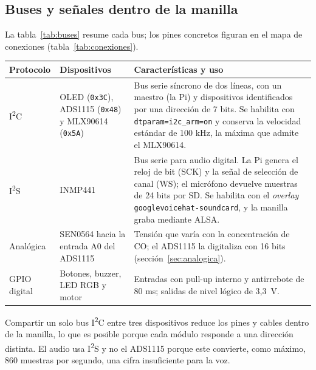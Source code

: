 \documentclass[10pt,a4paper]{article}
\newcommand{\code}[1]{{\small\urlstyle{tt}\nolinkurl{#1}}}
\begin{document}
\subsection{Buses y señales dentro de la manilla}
La tabla~\ref{tab:buses} resume cada bus; los pines concretos figuran en el mapa de conexiones (tabla~\ref{tab:conexiones}).

\label{tab:buses}
\begin{tabularx}{\linewidth}{@{}P{22mm}P{38mm}Y@{}}
\toprule\textbf{Protocolo} & \textbf{Dispositivos} & \textbf{Características y uso}\\\midrule
I\textsuperscript{2}C & OLED (\code{0x3C}), ADS1115 (\code{0x48}) y MLX90614 (\code{0x5A}) & Bus serie síncrono de dos líneas, con un maestro (la Pi) y dispositivos identificados por una dirección de 7 bits. Se habilita con \code{dtparam=i2c_arm=on} y conserva la velocidad estándar de 100 kHz, la máxima que admite el MLX90614.\\
I\textsuperscript{2}S & INMP441 & Bus serie para audio digital. La Pi genera el reloj de bit (SCK) y la señal de selección de canal (WS); el micrófono devuelve muestras de 24 bits por SD. Se habilita con el \emph{overlay} \code{googlevoicehat-soundcard}, y la manilla graba mediante ALSA.\\
Analógica & SEN0564 hacia la entrada A0 del ADS1115 & Tensión que varía con la concentración de CO; el ADS1115 la digitaliza con 16 bits (sección~\ref{sec:analogica}).\\
GPIO digital & Botones, buzzer, LED RGB y motor & Entradas con pull-up interno y antirrebote de 80 ms; salidas de nivel lógico de 3,3~V.\\\bottomrule
\end{tabularx}

Compartir un solo bus I\textsuperscript{2}C entre tres dispositivos reduce los pines y cables dentro de la manilla, lo que es posible porque cada módulo responde a una dirección distinta. El audio usa I\textsuperscript{2}S y no el ADS1115 porque este convierte, como máximo, 860 muestras por segundo, una cifra insuficiente para la voz.
\end{document}
